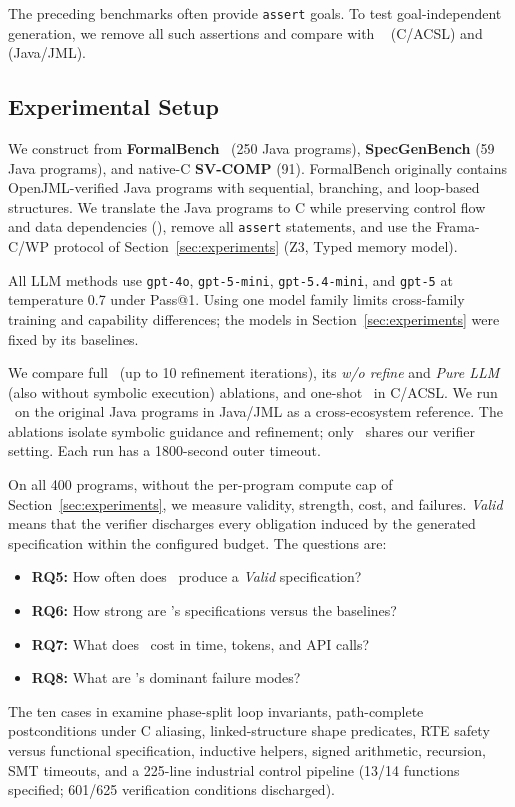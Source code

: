 \label{sec:large-scale-experiment}
The preceding benchmarks often provide \texttt{assert} goals. To test
goal-independent generation, we remove all such assertions and compare with
\autospec~\cite{autospec} (C/ACSL) and \specgen~\cite{SpecGen} (Java/JML).

\subsection{Experimental Setup}
We construct \textbf{} from \textbf{FormalBench}~\cite{le2025can}
(250 Java programs), \textbf{SpecGenBench} (59 Java programs), and native-C
\textbf{SV-COMP} (91). FormalBench originally contains OpenJML-verified Java
programs with sequential, branching, and loop-based structures. We translate
the Java programs to C while preserving
control flow and data dependencies {()},
remove all \texttt{assert} statements, and use the Frama-C/WP protocol of
Section~\ref{sec:experiments} (Z3, Typed memory model).

All LLM methods use \texttt{gpt-4o}, \texttt{gpt-5-mini},
\texttt{gpt-5.4-mini}, and \texttt{gpt-5} at temperature 0.7 under Pass@1.
Using one model family limits cross-family training and capability differences;
the models in Section~\ref{sec:experiments} were fixed by its baselines.

We compare full \toolname\ (up to 10 refinement iterations), its \emph{w/o
refine} and \emph{Pure LLM} (also without symbolic execution) ablations, and
one-shot \autospec\ in C/ACSL. We run \specgen\ on the original Java programs
in Java/JML as a cross-ecosystem reference. The ablations isolate symbolic
guidance and refinement; only \autospec\ shares our verifier setting. Each
run has a 1800-second outer timeout.

On all 400 programs, without the per-program compute cap of
Section~\ref{sec:experiments}, we measure validity, strength, cost, and failures.
\emph{Valid} means that the verifier discharges every obligation induced by the
generated specification within the configured budget. The questions are:
\begin{itemize}
    \item \textbf{RQ5:} How often does \toolname\ produce a
    \emph{Valid} specification?
    \item \textbf{RQ6:} How strong are \toolname's specifications
    versus the baselines?
    \item \textbf{RQ7:} What does \toolname\ cost in time, tokens, and
    API calls?
    \item \textbf{RQ8:} What are \toolname's dominant failure modes?
\end{itemize}






{The ten cases in  examine phase-split loop
invariants, path-complete postconditions under C aliasing, linked-structure
shape predicates, RTE safety versus functional specification, inductive
helpers, signed arithmetic, recursion, SMT timeouts, and a 225-line
industrial control pipeline (13/14 functions specified; 601/625 verification
conditions discharged).}
